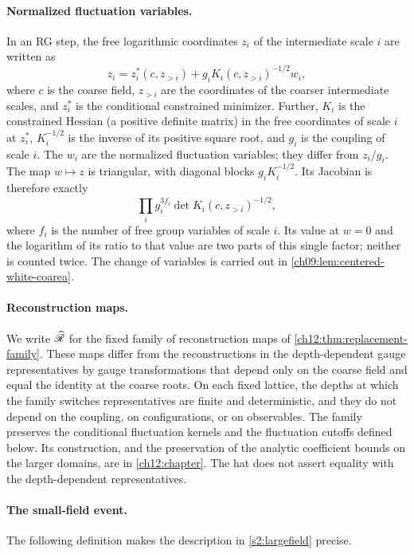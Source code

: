 \paragraph{Normalized fluctuation variables.}
In an RG step, the free logarithmic coordinates $z_i$ of the intermediate scale $i$ are written as
\begin{equation}\label{ch01:eq:normalized-fluctuations}
 z_i=z_i^*(c,z_{>i})+g_iK_i(c,z_{>i})^{-1/2}w_i,
\end{equation}
where $c$ is the coarse field, $z_{>i}$ are the coordinates of the coarser intermediate scales, and $z_i^*$ is the conditional constrained minimizer. Further, $K_i$ is the constrained Hessian (a positive definite matrix) in the free coordinates of scale $i$ at $z_i^*$, $K_i^{-1/2}$ is the inverse of its positive square root, and $g_i$ is the coupling of scale $i$. The $w_i$ are the normalized fluctuation variables; they differ from $z_i/g_i$. The map $w\mapsto z$ is triangular, with diagonal blocks $g_iK_i^{-1/2}$. Its Jacobian is therefore exactly
\[
 \prod_ig_i^{3f_i}\det K_i(c,z_{>i})^{-1/2},
\]
where $f_i$ is the number of free group variables of scale $i$. Its value at $w=0$ and the logarithm of its ratio to that value are two parts of this single factor; neither is counted twice. The change of variables is carried out in \cref{ch09:lem:centered-white-coarea}.

\paragraph{Reconstruction maps.}
We write $\widehat{\mathscr R}$ for the fixed family of reconstruction maps of \cref{ch12:thm:replacement-family}. These maps differ from the reconstructions in the depth-dependent gauge representatives by gauge transformations that depend only on the coarse field and equal the identity at the coarse roots. On each fixed lattice, the depths at which the family switches representatives are finite and deterministic, and they do not depend on the coupling, on configurations, or on observables. The family preserves the conditional fluctuation kernels and the fluctuation cutoffs defined below. Its construction, and the preservation of the analytic coefficient bounds on the larger domains, are in \cref{ch12:chapter}. The hat does not assert equality with the depth-dependent representatives.

\paragraph{The small-field event.}
The following definition makes the description in \cref{s2:largefield} precise.

